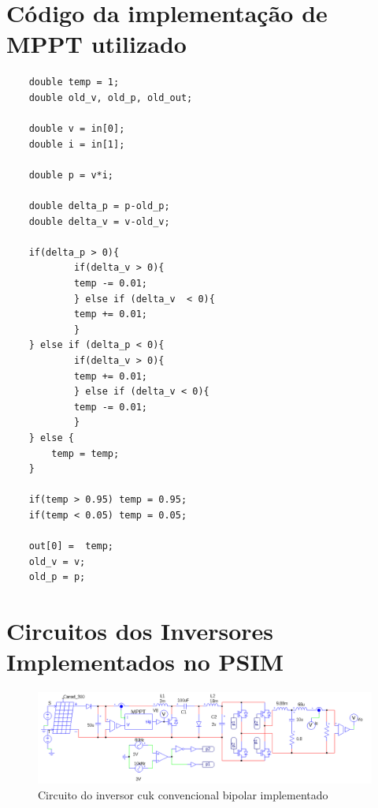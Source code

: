 \documentclass[
	12pt,				%
	openany,
	onseside,
	a4paper,			%
	english,			%
	french,				%
	spanish,			%
	brazil,				%
	]{abntex2}
\begin{document}
\begin{anexosenv}

	\partanexos

	\chapter{Código da implementação de MPPT utilizado}\label{anex:mppt_code}


	\begin{lstlisting}
	double temp = 1;
	double old_v, old_p, old_out;

	double v = in[0];
	double i = in[1];

	double p = v*i;

	double delta_p = p-old_p;
	double delta_v = v-old_v;

	if(delta_p > 0){
			if(delta_v > 0){
			temp -= 0.01; 
			} else if (delta_v  < 0){
			temp += 0.01;
			}
	} else if (delta_p < 0){
			if(delta_v > 0){
			temp += 0.01;
			} else if (delta_v < 0){
			temp -= 0.01; 
			}
	} else {
		temp = temp;
	}

	if(temp > 0.95) temp = 0.95;
	if(temp < 0.05) temp = 0.05;

	out[0] =  temp;
	old_v = v;
	old_p = p;

	\end{lstlisting}

	\chapter{Circuitos dos Inversores Implementados no PSIM} \label{anex:circ_images}

	\begin{figure}
		\centering
		\includegraphics[width=\linewidth]{comp_conv_circ_clean}
		\caption{Circuito do inversor cuk convencional bipolar implementado}	


\end{figure}
\end{anexosenv}
\end{document}

